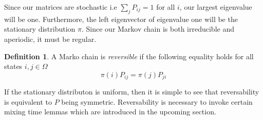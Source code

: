 \documentclass[12pt]{amsart}
\theoremstyle{definition}
\newtheorem{definition}[theorem]{Definition}
\theoremstyle{remark}
\numberwithin{equation}{section}
\theoremstyle{remark}
\begin{document}
\noindent Since our matrices are stochastic i.e $\sum_{j} P_{ij} = 1$ for all $i$, our largest eigenvalue will be one. Furthermore, the left eigenvector of eigenvalue one will be the stationary distribution $\pi$. Since our Markov chain is both irreducible and aperiodic, it must be regular.
%
\begin{definition}
A Marko chain is \emph{reversible} if the following equality holds for all states $i,j \in \Omega$
\begin{equation}
  \pi(i)P_{ij} = \pi(j)P_{ji}
\end{equation}
\end{definition}
\noindent If the stationary distributon is uniform, then it is simple to see that reversability is equivalent to $P$ being symmetric. Reversability is necessary to invoke certain mixing time lemmas which are introduced in the upcoming section.
\end{document}

